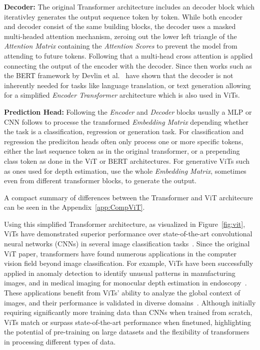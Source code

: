 \textbf{Decoder:} The original Transformer architecture includes an decoder block which iterativley generates the output sequence token by token. While both encoder and decoder consist of the same building blocks, the decoder uses a masked multi-headed attention mechanism, zeroing out the lower left triangle of the \emph{Attention Matrix} containing the \emph{Attention Scores} to prevent the model from attending to future tokens. 
Following that a multi-head cross attention is applied connecting the output of the encoder with the decoder.
Since then works such as the BERT framework by Devlin et al.~\cite{Devlin2018} have shown that the decoder is not inherently needed for tasks like language translation, or text generation allowing for a simplified \emph{Encoder Transformer} architecture which is also used in ViTs.

\textbf{Prediction Head:}
Following the \emph{Encoder} and \emph{Decoder} blocks usually a MLP or CNN follows to processe the transformed \emph{Embedding Matrix} depending whether the task is a classification, regression or generation task.
For classification and regression the prediciton heads often only process one or more specific tokens, either the last sequence token as in the original transformer, or a prepending class token as done in the ViT or BERT architectures.
For generative ViTs such as ones used for depth estimation, use the whole \emph{Embedding Matrix}, sometimes even from different transformer blocks, to generate the output\cite{Cui2024}.

A compact summary of differences between the Transformer and ViT architecure can be seen in the Appendix~\ref{app:CompViT}.

Using this simplified Transformer architecture, as visualized in Figure~\ref{fig:vit}, ViTs have demonstrated superior performance over state-of-the-art convolutional neural networks (CNNs) in several image classification tasks~\cite{Mauricio2023}. 
Since the original ViT paper, transformers have found numerous applications in the computer vision field beyond image classification. 
For example, ViTs have been successfully applied in anomaly detection to identify unusual patterns in manufacturing images, and in medical imaging for monocular depth estimation in endoscopy~\cite{Ranftl2021}. 
These applications benefit from ViTs' ability to analyze the global context of images, and their performance is validated in diverse domains~\cite{Jamil2023}.
Although initially requiring significantly more training data than CNNs when trained from scratch, ViTs match or surpass state-of-the-art performance when finetuned, highlighting the potential of pre-training on large datasets and the flexibility of transformers in processing different types of data.

